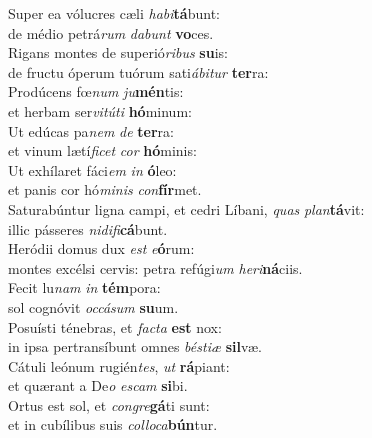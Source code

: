 \oddverse Super ea vólucres cæli \textit{ha}\textit{bi}\textbf{tá}bunt:~\*\\
\oddverse de médio petrá\textit{rum} \textit{da}\textit{bunt} \textbf{vo}ces.\\
\evenverse Rigans montes de superió\textit{ri}\textit{bus} \textbf{su}is:~\*\\
\evenverse de fructu óperum tuórum sati\textit{á}\textit{bi}\textit{tur} \textbf{ter}ra:\\
\oddverse Prodúcens fœ\textit{num} \textit{ju}\textbf{mén}tis:~\*\\
\oddverse et herbam ser\textit{vi}\textit{tú}\textit{ti} \textbf{hó}minum:\\
\evenverse Ut edúcas pa\textit{nem} \textit{de} \textbf{ter}ra:~\*\\
\evenverse et vinum lætí\textit{fi}\textit{cet} \textit{cor} \textbf{hó}minis:\\
\oddverse Ut exhílaret fáci\textit{em} \textit{in} \textbf{ó}leo:~\*\\
\oddverse et panis cor hó\textit{mi}\textit{nis} \textit{con}\textbf{fír}met.\\
\evenverse Saturabúntur ligna campi, et cedri Líbani, \textit{quas} \textit{plan}\textbf{tá}vit:~\*\\
\evenverse illic pásseres \textit{ni}\textit{di}\textit{fi}\textbf{cá}bunt.\\
\oddverse Heródii domus dux \textit{est} \textit{e}\textbf{ó}rum:~\*\\
\oddverse montes excélsi cervis: petra refúgi\textit{um} \textit{he}\textit{ri}\textbf{ná}ciis.\\
\evenverse Fecit lu\textit{nam} \textit{in} \textbf{tém}pora:~\*\\
\evenverse sol cognóvit \textit{oc}\textit{cá}\textit{sum} \textbf{su}um.\\
\oddverse Posuísti ténebras, et \textit{fa}\textit{cta} \textbf{est} nox:~\*\\
\oddverse in ipsa pertransíbunt omnes \textit{bé}\textit{sti}\textit{æ} \textbf{sil}væ.\\
\evenverse Cátuli leónum rugién\textit{tes}, \textit{ut} \textbf{rá}piant:~\*\\
\evenverse et quærant a De\textit{o} \textit{e}\textit{scam} \textbf{si}bi.\\
\oddverse Ortus est sol, et \textit{con}\textit{gre}\textbf{gá}ti sunt:~\*\\
\oddverse et in cubílibus suis \textit{col}\textit{lo}\textit{ca}\textbf{bún}tur.\\
